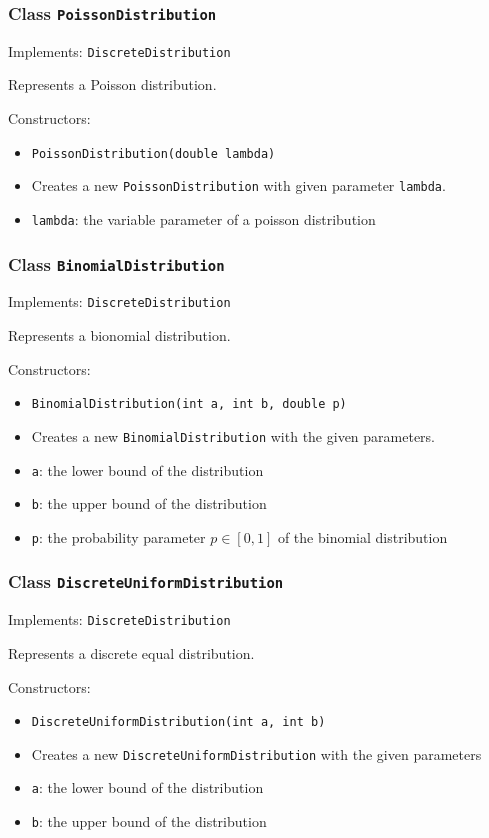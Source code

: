 \documentclass[parskip=full,11pt]{scrartcl}
\begin{document}
\subsubsection{Class \texttt{PoissonDistribution}}
Implements: \texttt{DiscreteDistribution}

Represents a Poisson distribution.

Constructors:
\begin{itemize}\itemsep -10pt
\item \texttt{PoissonDistribution(double lambda)}
\item[] Creates a new \texttt{PoissonDistribution} with given parameter \texttt{lambda}.
\item[] \texttt{lambda}: the variable parameter of a poisson distribution
\end{itemize}

\subsubsection{Class \texttt{BinomialDistribution}}
Implements: \texttt{DiscreteDistribution}

Represents a bionomial distribution.

Constructors:
\begin{itemize}\itemsep -10pt
\item \texttt{BinomialDistribution(int a, int b, double p)}
\item[] Creates a new \texttt{BinomialDistribution} with the given parameters.
\item[] \texttt{a}: the lower bound of the distribution
\item[] \texttt{b}: the upper bound of the distribution
\item[] \texttt{p}: the probability parameter \(p \in [0,1]\) of the binomial distribution
\end{itemize}

\subsubsection{Class \texttt{DiscreteUniformDistribution}}
Implements: \texttt{DiscreteDistribution}

Represents a discrete equal distribution.

Constructors:
\begin{itemize}\itemsep -10pt
\item \texttt{DiscreteUniformDistribution(int a, int b)}
\item[] Creates a new \texttt{DiscreteUniformDistribution} with the given parameters
\item[] \texttt{a}: the lower bound of the distribution
\item[] \texttt{b}: the upper bound of the distribution
\end{itemize}
\end{document}
